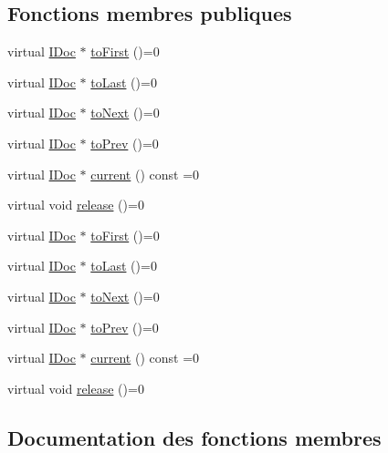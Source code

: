 \subsection*{Fonctions membres publiques}
\begin{DoxyCompactItemize}
\item 
virtual \hyperlink{class_i_doc}{I\+Doc} $\ast$ \hyperlink{class_i_doc_iterator_aadc1f61e6894944f5487ac6e0d186a90}{to\+First} ()=0
\item 
virtual \hyperlink{class_i_doc}{I\+Doc} $\ast$ \hyperlink{class_i_doc_iterator_a8356a7431b9470d74a2e935fa6d1956e}{to\+Last} ()=0
\item 
virtual \hyperlink{class_i_doc}{I\+Doc} $\ast$ \hyperlink{class_i_doc_iterator_a6f1bc9563d9008d3f661b98c5c87066c}{to\+Next} ()=0
\item 
virtual \hyperlink{class_i_doc}{I\+Doc} $\ast$ \hyperlink{class_i_doc_iterator_a4132ed88a702854345611b79b9a23eee}{to\+Prev} ()=0
\item 
virtual \hyperlink{class_i_doc}{I\+Doc} $\ast$ \hyperlink{class_i_doc_iterator_a146e6bb0f4123afc4c7a972fbed68408}{current} () const  =0
\item 
virtual void \hyperlink{class_i_doc_iterator_a0876d4fe51d8dc795764951ff6eee220}{release} ()=0
\item 
virtual \hyperlink{class_i_doc}{I\+Doc} $\ast$ \hyperlink{class_i_doc_iterator_aadc1f61e6894944f5487ac6e0d186a90}{to\+First} ()=0
\item 
virtual \hyperlink{class_i_doc}{I\+Doc} $\ast$ \hyperlink{class_i_doc_iterator_a8356a7431b9470d74a2e935fa6d1956e}{to\+Last} ()=0
\item 
virtual \hyperlink{class_i_doc}{I\+Doc} $\ast$ \hyperlink{class_i_doc_iterator_a6f1bc9563d9008d3f661b98c5c87066c}{to\+Next} ()=0
\item 
virtual \hyperlink{class_i_doc}{I\+Doc} $\ast$ \hyperlink{class_i_doc_iterator_a4132ed88a702854345611b79b9a23eee}{to\+Prev} ()=0
\item 
virtual \hyperlink{class_i_doc}{I\+Doc} $\ast$ \hyperlink{class_i_doc_iterator_a146e6bb0f4123afc4c7a972fbed68408}{current} () const  =0
\item 
virtual void \hyperlink{class_i_doc_iterator_a0876d4fe51d8dc795764951ff6eee220}{release} ()=0
\end{DoxyCompactItemize}


\subsection{Documentation des fonctions membres}
\hypertarget{class_i_doc_iterator_a146e6bb0f4123afc4c7a972fbed68408}{}
